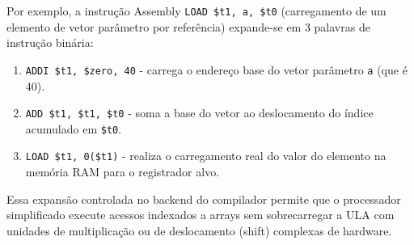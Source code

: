 Por exemplo, a instrução Assembly \texttt{LOAD \$t1, a, \$t0} (carregamento de um elemento de vetor parâmetro por referência) expande-se em 3 palavras de instrução binária:
\begin{enumerate}
    \item \texttt{ADDI \$t1, \$zero, 40} - carrega o endereço base do vetor parâmetro \texttt{a} (que é 40).
    \item \texttt{ADD \$t1, \$t1, \$t0} - soma a base do vetor ao deslocamento do índice acumulado em \texttt{\$t0}.
    \item \texttt{LOAD \$t1, 0(\$t1)} - realiza o carregamento real do valor do elemento na memória RAM para o registrador alvo.
\end{enumerate}

Essa expansão controlada no backend do compilador permite que o processador simplificado execute acessos indexados a arrays sem sobrecarregar a ULA com unidades de multiplicação ou de deslocamento (shift) complexas de hardware.

